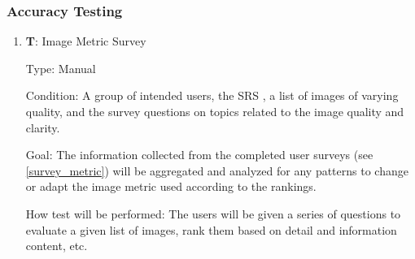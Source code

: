 \documentclass[12pt, titlepage]{article}
\newcounter{testnum} %
\begin{document}
\subsubsection{Accuracy Testing}
\begin{enumerate}

  \item{\textbf{T\thetestnum \label{T_surveyMetric}}: Image Metric Survey\\}

  Type: Manual
            
  Condition: A group of intended users, the SRS \citep{SRS}, 
  a list of images of varying quality, and the survey questions on topics related 
  to the image quality and clarity.
            
  Goal: The information collected from the completed user surveys (see \ref{survey_metric})
    will be aggregated and analyzed for any patterns to
    change or adapt the image metric used according to the rankings.
            
  How test will be performed: The users will be given a series of questions to evaluate 
    a given list of images, rank them based on detail and information content, etc.
  
\end{enumerate}
\end{document}

